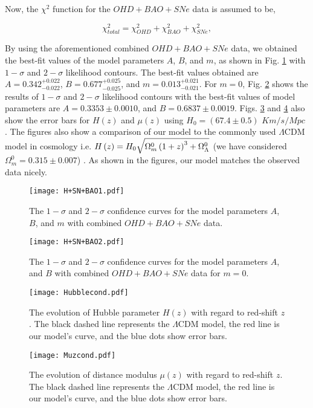 \documentclass[prd,superscriptaddress,amsfonts,amssymb,amsmath,showpacs,twocolumn]{revtex4-2}
\begin{document}
Now, the $\chi^{2}$ function for the $OHD+BAO+SNe$ data is assumed to be, 

\begin{equation}
\chi^{2}_{total}=\chi^{2}_{OHD}+\chi^{2}_{BAO}+\chi^{2}_{SNe},
\end{equation}

By using the aforementioned combined $OHD+BAO+SNe$ data, we obtained the
best-fit values of the model parameters $A$, $B$, and $m$, as shown in Fig. %
\ref{H+SN+BAO1} with $1-\sigma$ and $2-\sigma$ likelihood contours. The
best-fit values obtained are $A=0.342^{+0.022}_{-0.022}$, $%
B=0.677^{+0.025}_{-0.025}$, and $m=0.013^{+0.021}_{-0.021}$. For $m=0$,
Fig. \ref{H+SN+BAO2} shows the results of $1-\sigma$ and $2-\sigma$
likelihood contours with the best-fit values of model parameters are $%
A=0.3353\pm 0.0010$, and $B=0.6837 \pm0.0019$.
Figs. \ref{ErrorHubble} and \ref{ErrorSNe} also show the error bars for $H(z)
$ and $\mu(z)$ using $H_{0}=(67.4\pm0.5)$ $Km/s/Mpc$  
\cite{Planck2020}. The figures also show a comparison of our model to the commonly
used $\Lambda$CDM model in cosmology i.e. $H\left( z\right) =H_{0}\sqrt{%
\Omega _{m}^{0}\left( 1+z\right) ^{3}+\Omega _{\Lambda}^{0}}$ (we have
considered $\Omega _{m}^{0}=0.315\pm 0.007$) \cite{Planck2020}. As shown in
the figures, our model matches the observed data nicely.

\begin{widetext}

\begin{figure}[h]
\centerline{\texttt{[image: H+SN+BAO1.pdf]}}
\caption{The $1-\sigma$ and $2-\sigma$ confidence curves for the model parameters $A$, $B$, and $m$ with combined $OHD+BAO+SNe$ data.}
\label{H+SN+BAO1}
\end{figure}

\begin{figure}[H]
\centerline{\texttt{[image: H+SN+BAO2.pdf]}}
\caption{The $1-\sigma$ and $2-\sigma$ confidence curves for the model parameters $A$, and $B$ with combined $OHD+BAO+SNe$ data for $m=0$.}
\label{H+SN+BAO2}
\end{figure}

\begin{figure}[H]
\centerline{\texttt{[image: Hubblecond.pdf]}}
\caption{The evolution of Hubble parameter $H(z)$ with regard to red-shift $z$. The black dashed line represents the $\Lambda$CDM model, the red line is our model's curve, and the blue dots show error bars.}
\label{ErrorHubble}
\end{figure}

\begin{figure}[H]
\centerline{\texttt{[image: Muzcond.pdf]}}
\caption{The evolution of distance modulus $\mu(z)$ with regard to red-shift $z$. The black dashed line represents the $\Lambda$CDM model, the red line is our model's curve, and the blue dots show error bars.}
\label{ErrorSNe}
\end{figure}
\end{widetext}
\end{document}
